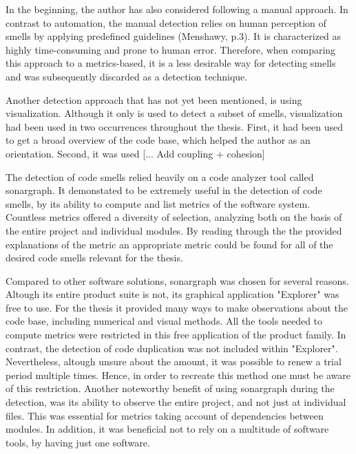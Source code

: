 In the beginning, the author has also considered following a manual approach. In contrast to automation, the manual detection relies on human perception of smells by applying predefined guidelines (Menshawy, p.3). It is characterized as highly time-consuming and prone to human error. Therefore, when comparing this approach to a metrics-based, it is a less desirable way for detecting smells and was subsequently discarded as a detection technique.

Another detection approach that has not yet been mentioned, is using visualization. Although it only is used to detect a subset of smells, visualization had been used in two occurrences throughout the thesis. First, it had been used to get a broad overview of the code base, which helped the author as an orientation. Second, it was used [... Add coupling + cohesion]

The detection of code smells relied heavily on a code analyzer tool called sonargraph. It demonstated to be extremely useful in the detection of code smells, by its ability to compute and list metrics of the software system. Countless metrics offered a diversity of selection, analyzing both on the basis of the entire project and individual modules. By reading through the the provided explanations of the metric an appropriate metric could be found for all of the desired code smells relevant for the thesis.

Compared to other software solutions, sonargraph was chosen for several reasons. Altough its entire product suite is not, its graphical application "Explorer" was free to use. For the thesis it provided many ways to make observations about the code base, including numerical and visual methods. All the tools needed to compute metrics were restricted in this free application of the product family. In contrast, the detection of code duplication was not included within "Explorer". Nevertheless, altough unsure about the amount, it was possible to renew a trial period multiple times. Hence, in order to recreate this method one must be aware of this restriction. Another noteworthy benefit of using sonargraph during the detection, was its ability to observe the entire project,  and not just at individual files. This was essential for metrics taking account of dependencies between modules. In addition, it was beneficial not to rely on a multitude of software tools, by having just one software.



